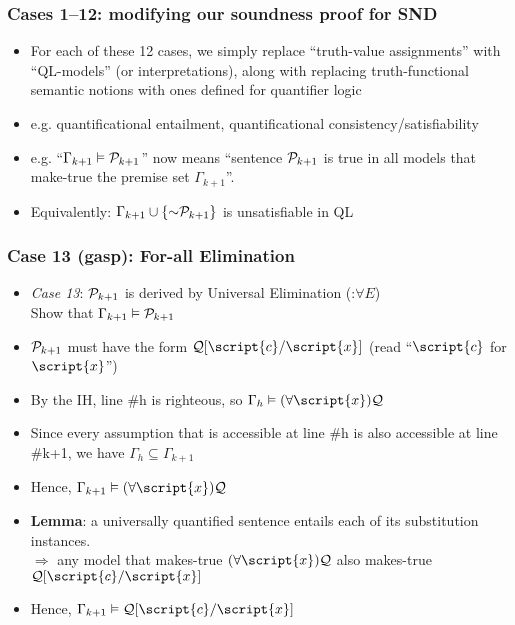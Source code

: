\begin{frame}
\frametitle{Cases 1--12: modifying our soundness proof for SND}

\begin{itemize}[<+->]

\item For each of these 12 cases, we simply replace ``truth-value assignments'' with ``QL-models'' (or interpretations), along with replacing truth-functional semantic notions with ones defined for quantifier logic

\item e.g. quantificational entailment, quantificational consistency/satisfiability 

\item e.g. ``$\Gamma_{k+1} \vDash \mathcal{P}_{k+1}$'' now means ``sentence $\mathcal{P}_{k+1}$ is true in all models that make-true the premise set $\Gamma_{k+1}$''. 

\item Equivalently: $\Gamma_{k+1} \cup \{ \enot \metav{P}_{k+1} \}$ is unsatisfiable in QL


\end{itemize}
\end{frame}


\begin{frame}
\frametitle{Case 13 (gasp): For-all Elimination}

\begin{itemize}[<+->]

\item \emph{Case 13}: $\mathcal{P}_{k +1}$ is derived by Universal Elimination (:$\forall E$) \\ Show that $\Gamma_{k+1} \vDash \mathcal{P}_{k+1}$

\item $\mathcal{P}_{k+1}$ must have the form $\metav{Q}\substitute{\script{x}}{\script{c}}$ (read ``$\script{c}$ for $\script{x}$'')

\item By the IH,  line \#h is righteous, so $\Gamma_{h} \entails \qt{\forall}{\script{x}}\metav{Q}$

\item Since every assumption that is accessible at line \#h is also accessible at line \#k+1, we have $\Gamma_h \subseteq \Gamma_{k+1}$

\item Hence, $\Gamma_{k+1} \entails \qt{\forall}{\script{x}}\metav{Q}$

\item \textbf{Lemma}: a universally quantified sentence entails each of its substitution instances. \\ $\Rightarrow$ any model that makes-true $\qt{\forall}{\script{x}}\metav{Q}$ also makes-true $\metav{Q}\substitute{\script{x}}{\script{c}}$

\item Hence, $\Gamma_{k+1} \entails \metav{Q}\substitute{\script{x}}{\script{c}}$

\end{itemize}
\end{frame}

